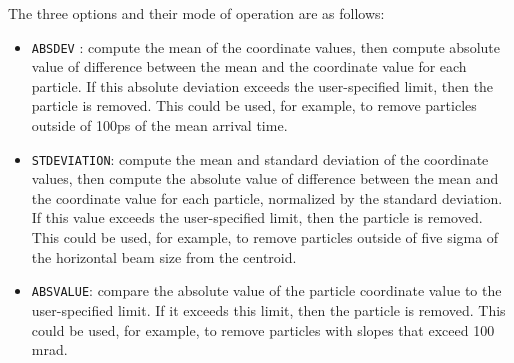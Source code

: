 The three options and their mode of operation are as follows:
\begin{itemize}

\item \verb|ABSDEV| : compute the mean of the coordinate values, then compute absolute value of difference
between the mean and the coordinate value for each particle. If this absolute deviation exceeds
the user-specified limit, then the particle is removed. This could be used, for
example, to remove particles outside of 100ps of the mean arrival time.

\item \verb|STDEVIATION|: compute the mean and standard deviation of the
coordinate values, then compute the absolute value of difference between the
mean and the coordinate value for each particle, normalized by the standard
deviation. If this value exceeds the user-specified limit, then the
particle is removed. This could be used, for example, to remove
particles outside of five sigma of the horizontal beam size from the centroid.

\item \verb|ABSVALUE|: compare the absolute value of the particle coordinate value to the
user-specified limit. If it exceeds this limit, then the particle is removed.
This could be used, for example, to remove particles with slopes that exceed 100 mrad.

\end{itemize}
